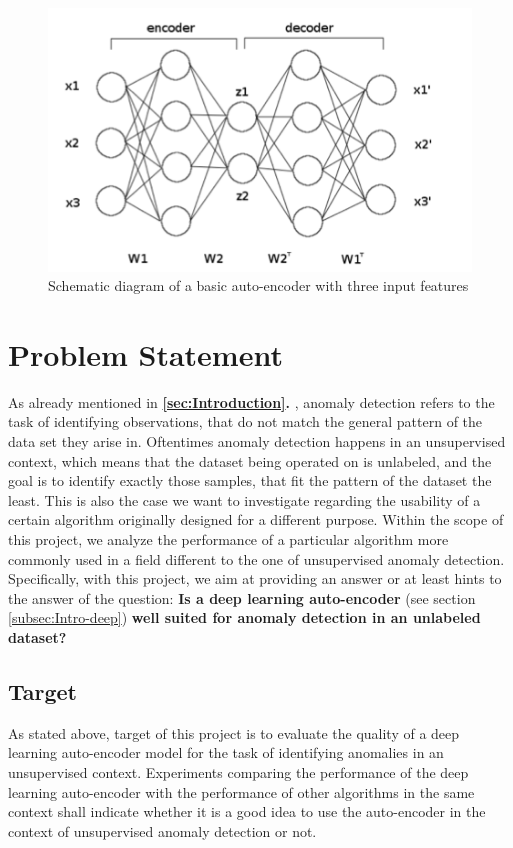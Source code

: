 \documentclass{vldb}
\begin{document}
\begin{figure}
\centering
\includegraphics[width=\linewidth]{"pics/auto-encoder"}
\caption{Schematic diagram of a basic auto-encoder with three input features}
\label{fig:auto-encoder}
\end{figure}

\section{Problem Statement} \label{problem_statement}
As already mentioned in \textbf{\ref{sec:Introduction}. }, anomaly detection refers to the task of identifying observations, that do not match the general pattern of the data set they arise in. Oftentimes anomaly detection happens in an unsupervised context, which means that the dataset being operated on is unlabeled, and the goal is to identify exactly those samples, that fit the pattern of the dataset the least. This is also the case we want to investigate regarding the usability of a certain algorithm originally designed for a different purpose. Within the scope of this project, we analyze the performance of a particular algorithm more commonly used in a field different to the one of unsupervised anomaly detection. Specifically, with this project, we aim at providing an answer or at least hints to the answer of the question: \textbf{Is a deep learning auto-encoder} (see section \ref{subsec:Intro-deep}) \textbf{well suited for anomaly detection in an unlabeled dataset?}
\subsection{Target}\label{target}
As stated above, target of this project is to evaluate the quality of a deep learning auto-encoder model for the task of identifying anomalies in an unsupervised context. Experiments comparing the performance of the deep learning auto-encoder with the performance of other algorithms in the same context shall indicate whether it is a good idea to use the auto-encoder in the context of unsupervised anomaly detection or not.
\end{document}
